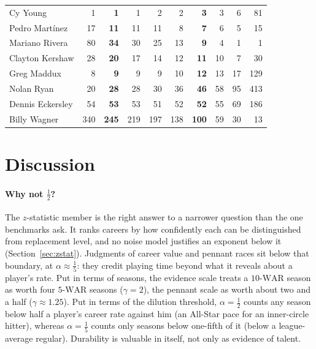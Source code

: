 \documentclass[11pt,letterpaper]{article}
\theoremstyle{plain}
\theoremstyle{definition}
\theoremstyle{remark}
\newcommand{\WAR}{\mathrm{WAR}}
\begin{document}
\begin{table}[htbp]
\begin{tabular}{@{}lrrrrrrrrr@{}}
Cy Young         & 1   & \textbf{1}   & 1   & 2   & 2   & \textbf{3}   & 3   & 6   & 81  \\
Pedro Mart\'{i}nez & 17 & \textbf{11}  & 11 & 11  & 8   & \textbf{7}   & 6   & 5   & 15  \\
Mariano Rivera   & 80  & \textbf{34}  & 30  & 25  & 13  & \textbf{9}   & 4   & 1   & 1   \\
Clayton Kershaw  & 28  & \textbf{20}  & 17  & 14  & 12  & \textbf{11}  & 10  & 7   & 30  \\
Greg Maddux      & 8   & \textbf{9}   & 9   & 9   & 10  & \textbf{12}  & 13  & 17  & 129 \\
Nolan Ryan       & 20  & \textbf{28}  & 28  & 30  & 36  & \textbf{46}  & 58  & 95  & 413 \\
Dennis Eckersley & 54  & \textbf{53}  & 53  & 51  & 52  & \textbf{52}  & 55  & 69  & 186 \\
Billy Wagner     & 340 & \textbf{245} & 219 & 197 & 138 & \textbf{100} & 59  & 30  & 13  \\
\bottomrule
\end{tabular}
\end{table}


\section{Discussion}
\label{sec:discussion}

\paragraph{Why not $\tfrac12$?} The $z$-statistic member is the right answer to a narrower question than the one benchmarks ask. It ranks careers by how confidently each can be distinguished from replacement level, and no noise model justifies an exponent below it (Section~\ref{sec:zstat}). Judgments of career value and pennant races sit below that boundary, at $\alpha \approx \tfrac15$: they credit playing time beyond what it reveals about a player's rate. Put in terms of seasons, the evidence scale treats a $10$-$\WAR$ season as worth four $5$-$\WAR$ seasons ($\gamma = 2$), the pennant scale as worth about two and a half ($\gamma \approx 1.25$). Put in terms of the dilution threshold, $\alpha = \tfrac12$ counts any season below half a player's career rate against him (an All-Star pace for an inner-circle hitter), whereas $\alpha = \tfrac15$ counts only seasons below one-fifth of it (below a league-average regular). Durability is valuable in itself, not only as evidence of talent.
\end{document}
